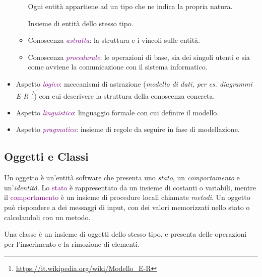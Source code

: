 \begin{itemize}
\begin{itemize}
\begin{definition}
                    Ogni entità appartiene ad un tipo che ne indica la propria natura.
                \end{definition}
                \begin{definition}[Collezione]
                    Insieme di entità dello stesso tipo.
                \end{definition}
            \item Conoscenza \emph{\textcolor{purple}{astratta}}: la struttura e i vincoli sulle entità.
            \item Conoscenza \emph{\textcolor{purple}{procedurale}}: le operazioni di base, sia dei singoli utenti e sia come avviene la comunicazione con il sistema informatico.
        \end{itemize}
    \item Aspetto \emph{\textcolor{purple}{logico}}: meccanismi di astrazione (\emph{modello di dati, per es. diagrammi E-R \footnote{\url{https://it.wikipedia.org/wiki/Modello_E-R}}}) con cui descrivere la struttura della conoscenza concreta.
    \item Aspetto \emph{\textcolor{purple}{linguistico}}: linguaggio formale con cui definire il modello.
    \item Aspetto \emph{\textcolor{purple}{pragmatico}}: insieme di regole da seguire in fase di modellazione.
\end{itemize}

\subsection{Oggetti e Classi}

\begin{definition}[Oggetto]
    Un oggetto è un'entità software che presenta uno \emph{stato}, un \emph{comportamento} e un'\emph{identità}.
    Lo \textcolor{purple}{stato} è rappresentato da un insieme di costanti o variabili, mentre il \textcolor{purple}{comportamento} è un
    insieme di procedure locali chiamate \emph{metodi}.
    Un oggetto può rispondere a dei messaggi di input, con dei valori memorizzati nello stato o
    calcolandoli con un metodo.
\end{definition}

\begin{definition}[Classe]
    Una classe è un insieme di oggetti dello stesso tipo, e presenta delle operazioni per l'inserimento
    e la rimozione di elementi.
\end{definition}

